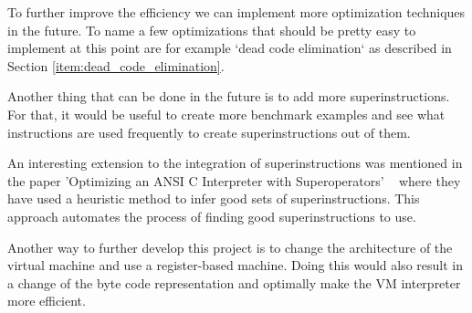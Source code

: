 \documentclass{article}
\begin{document}
To further improve the efficiency we can implement more optimization techniques
in the future. To name a few optimizations that should be pretty easy to
implement at this point are for example `dead code elimination` as described in
Section \ref{item:dead_code_elimination}.

Another thing that can be done in the future is to add more superinstructions.
For that, it would be useful to create more benchmark examples and see what
instructions are used frequently to create superinstructions out of them.

An interesting extension to the integration of superinstructions was mentioned
in the paper 'Optimizing an ANSI C Interpreter with Superoperators'
~\cite{superoperators} where they have used a heuristic method to infer good
sets of superinstructions. This approach automates the process of finding good
superinstructions to use.

Another way to further develop this project is to change the architecture of the
virtual machine and use a register-based machine. Doing this would also result
in a change of the byte code representation and optimally make the VM interpreter
more efficient.

\clearpage


\end{document}
